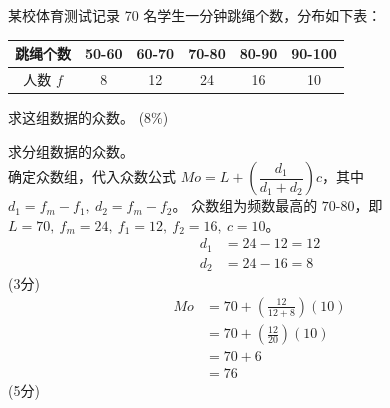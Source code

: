 \documentclass[12pt,a4paper]{exam-zh}
\begin{document}
\begin{question}[points = 8]
    某校体育测试记录 70 名学生一分钟跳绳个数，分布如下表：

    \begin{center}
    \begin{tabular}{|c|c|c|c|c|c|}
        \hline
        跳绳个数 & 50-60 & 60-70 & 70-80 & 80-90 & 90-100 \\
        \hline
        人数 $f$ & 8 & 12 & 24 & 16 & 10 \\
        \hline
    \end{tabular}
    \end{center}

    求这组数据的众数。
    \hfill (8\%)
\end{question}

\begin{solution}
    求分组数据的众数。 \\
    确定众数组，代入众数公式 $Mo=L+\left(\dfrac{d_1}{d_1+d_2}\right)c$，其中 $d_1=f_m-f_1,\ d_2=f_m-f_2$。
    众数组为频数最高的 $70\text{-}80$，即 $L=70,\ f_m=24,\ f_1=12,\ f_2=16,\ c=10$。
    \begin{align*}
        d_1 &= 24-12 = 12 \\
        d_2 &= 24-16 = 8
    \end{align*}
    \hfill (3分)
    \begin{align*}
        Mo &= 70 + \left(\frac{12}{12+8}\right)(10) \\
        &= 70 + \left(\frac{12}{20}\right)(10) \\
        &= 70+6 \\
        &= 76
    \end{align*}
    \hfill (5分)
\end{solution}
\end{document}
